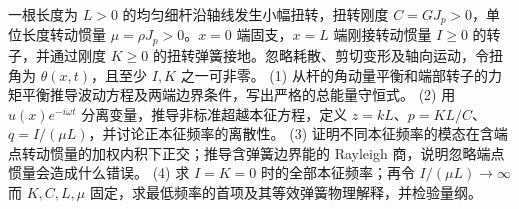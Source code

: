 一根长度为 \(L>0\) 的均匀细杆沿轴线发生小幅扭转，扭转刚度 \(C=GJ_p>0\)，单位长度转动惯量 \(\mu=\rho J_p>0\)。\(x=0\) 端固支，\(x=L\) 端刚接转动惯量 \(I\geq0\) 的转子，并通过刚度 \(K\geq0\) 的扭转弹簧接地。忽略耗散、剪切变形及轴向运动，令扭角为 \(\theta(x,t)\)，且至少 \(I,K\) 之一可非零。
(1) 从杆的角动量平衡和端部转子的力矩平衡推导波动方程及两端边界条件，写出严格的总能量守恒式。
(2) 用 \(u(x)e^{-i\omega t}\) 分离变量，推导非标准超越本征方程，定义 \(z=kL\)、\(p=KL/C\)、\(q=I/(\mu L)\)，并讨论正本征频率的离散性。
(3) 证明不同本征频率的模态在含端点转动惯量的加权内积下正交；推导含弹簧边界能的 Rayleigh 商，说明忽略端点惯量会造成什么错误。
(4) 求 \(I=K=0\) 时的全部本征频率；再令 \(I/(\mu L)\to\infty\) 而 \(K,C,L,\mu\) 固定，求最低频率的首项及其等效弹簧物理解释，并检验量纲。
